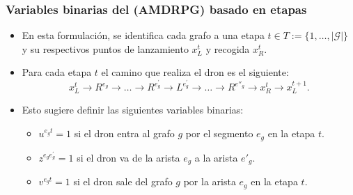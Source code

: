 \documentclass[slidestop,usepdftitle=false, xcolor=table]{beamer}
\begin{document}
\begin{frame}
	\frametitle{Variables binarias del (AMDRPG) basado en etapas}
	\begin{itemize}
	\item En esta formulación, se identifica cada grafo a una etapa $t\in T:=\{1,\ldots,|\mathcal G|\}$ y su respectivos puntos de lanzamiento $x_L^t$ y recogida $x_R^t$.
	\item Para cada etapa $t$ el camino que realiza el dron es el siguiente:
	 \begin{equation*}
	 x_L^t\rightarrow R^{e_g}\rightarrow\ldots\rightarrow R^{e^\prime_g}\rightarrow L^{e^\prime_g}\rightarrow \ldots \rightarrow R^{e''_g} \rightarrow x_R^t\rightarrow x_L^{t+1}.
	 \end{equation*}
	 \item Esto sugiere definir las siguientes variables binarias:
	 \begin{itemize}
	 	\item $u^{e_gt} = 1$ si el dron entra al grafo $g$ por el segmento $e_g$ en la etapa $t$.
   		\item $z^{e_ge^\prime_g} = 1$ si el dron va de la arista $e_g$ a la arista $e'_g$.
    	\item $v^{e_gt} = 1$ si el dron sale del grafo $g$ por la arista $e_g$ en la etapa $t$.
	\end{itemize}
	\end{itemize}
	\end{frame}
\end{document}
